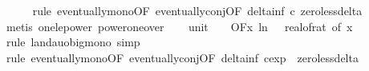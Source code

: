 \begin{isabellebody}
\ \ \ \ \isamarkupfalse%
\ {\isacharparenleft}{\kern0pt}rule\ eventually{\isacharunderscore}{\kern0pt}mono{\isacharbrackleft}{\kern0pt}OF\ eventually{\isacharunderscore}{\kern0pt}conj{\isacharbrackleft}{\kern0pt}OF\ delta{\isacharunderscore}{\kern0pt}inf{\isacharbrackleft}{\kern0pt}\ c{\isacharequal}{\kern0pt}{\isachardoublequoteopen}{}{\isachardoublequoteclose}{\isacharbrackright}{\kern0pt}\ zero{\isacharunderscore}{\kern0pt}less{\isacharunderscore}{\kern0pt}delta{\isacharbrackright}{\kern0pt}{\isacharbrackright}{\kern0pt}{\isacharparenright}{\kern0pt}\isanewline
\ \ \ \ \isamarkupfalse%
\ {\isacharparenleft}{\kern0pt}metis\ one{\isacharunderscore}{\kern0pt}le{\isacharunderscore}{\kern0pt}power\ power{\isacharunderscore}{\kern0pt}one{\isacharunderscore}{\kern0pt}over{\isacharparenright}{\kern0pt}\isanewline
\isanewline
\ \ \isamarkupfalse%
\ unit{\isacharunderscore}{\kern0pt}{}{\isacharcolon}{\kern0pt}\ {\isachardoublequoteopen}{\isacharparenleft}{\kern0pt}{\isasymlambda}{\isacharunderscore}{\kern0pt}{\isachardot}{\kern0pt}\ {}{\isacharparenright}{\kern0pt}\ {\isasymin}\ O{\isacharbrackleft}{\kern0pt}{\isacharquery}{\kern0pt}F{\isacharbrackright}{\kern0pt}{\isacharparenleft}{\kern0pt}{\isasymlambda}x{\isachardot}{\kern0pt}\ ln\ {\isacharparenleft}{\kern0pt}{}\ {\isacharslash}{\kern0pt}\ real{\isacharunderscore}{\kern0pt}of{\isacharunderscore}{\kern0pt}rat\ {\isacharparenleft}{\kern0pt}{\isasymdelta}{\isacharunderscore}{\kern0pt}of\ x{\isacharparenright}{\kern0pt}{\isacharparenright}{\kern0pt}{\isacharparenright}{\kern0pt}{\isachardoublequoteclose}\isanewline
\ \ \ \ \isamarkupfalse%
\ {\isacharparenleft}{\kern0pt}rule\ landau{\isacharunderscore}{\kern0pt}o{\isachardot}{\kern0pt}big{\isacharunderscore}{\kern0pt}mono{\isacharcomma}{\kern0pt}\ simp{\isacharparenright}{\kern0pt}\isanewline
\ \ \ \ \isamarkupfalse%
\ {\isacharparenleft}{\kern0pt}rule\ eventually{\isacharunderscore}{\kern0pt}mono{\isacharbrackleft}{\kern0pt}OF\ eventually{\isacharunderscore}{\kern0pt}conj{\isacharbrackleft}{\kern0pt}OF\ delta{\isacharunderscore}{\kern0pt}inf{\isacharbrackleft}{\kern0pt}\ c{\isacharequal}{\kern0pt}{\isachardoublequoteopen}exp\ {}{\isachardoublequoteclose}{\isacharbrackright}{\kern0pt}\ zero{\isacharunderscore}{\kern0pt}less{\isacharunderscore}{\kern0pt}delta{\isacharbrackright}{\kern0pt}{\isacharbrackright}{\kern0pt}{\isacharparenright}{\kern0pt}\isanewline
\ \ \ \ \isamarkupfalse%

\end{isabellebody}
